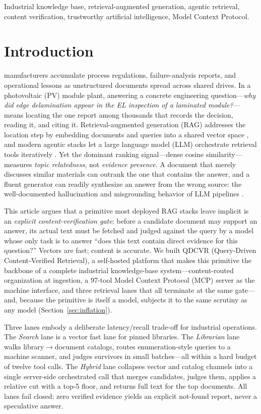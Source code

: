 \documentclass[journal]{IEEEtran}
\begin{document}
\begin{IEEEkeywords}
Industrial knowledge base, retrieval-augmented generation, agentic
retrieval, content verification, trustworthy artificial intelligence,
Model Context Protocol.
\end{IEEEkeywords}

\section{Introduction}
 manufacturers accumulate process regulations,
failure-analysis reports, and operational lessons as unstructured
documents spread across shared drives. In a photovoltaic (PV) module
plant, answering a concrete engineering question---\emph{why did edge
delamination appear in the EL inspection of a laminated module?}---means
locating the one report among thousands that records the decision,
reading it, and citing it. Retrieval-augmented generation (RAG) addresses
the location step by embedding documents and queries into a shared vector
space \cite{rag-lewis,dpr}, and modern agentic stacks let a large
language model (LLM) orchestrate retrieval tools iteratively
\cite{mcp,singh-agentic-rag}. Yet the dominant ranking signal---dense
cosine similarity---measures \emph{topic relatedness}, not \emph{evidence
presence}. A document that merely discusses similar materials can outrank
the one that contains the answer, and a fluent generator can readily
synthesize an answer from the wrong source: the well-documented
hallucination and misgrounding behavior of LLM pipelines \cite{siren}.

This article argues that a primitive most deployed RAG stacks leave
implicit is an \emph{explicit content-verification gate}: before a
candidate document may support an answer, its actual text must be fetched
and judged against the query by a model whose only task is to answer
``does this text contain direct evidence for this question?'' Vectors are
fast; content is accurate. We built QDCVR (Query-Driven Content-Verified
Retrieval), a self-hosted platform that makes this primitive the backbone
of a complete industrial knowledge-base system---content-routed
organization at ingestion, a 97-tool Model Context Protocol (MCP) server
\cite{mcp} as the machine interface, and three retrieval lanes that all
terminate at the same gate---and, because the primitive is itself a
model, subjects it to the same scrutiny as any model
(Section~\ref{sec:inflation}).

Three lanes embody a deliberate latency/recall trade-off for industrial
operations. The \emph{Search} lane is a vector fast lane for pinned
libraries. The \emph{Librarian} lane walks library$\to$document catalogs,
routes enumeration-style queries to a machine scanner, and judges
survivors in small batches---all within a hard budget of twelve tool
calls. The \emph{Hybrid} lane collapses vector and catalog channels into
a single server-side orchestrated call that merges candidates, judges
them, applies a relative cut with a top-5 floor, and returns full text
for the top documents. All lanes fail closed: zero verified evidence
yields an explicit not-found report, never a speculative answer.
\end{document}
